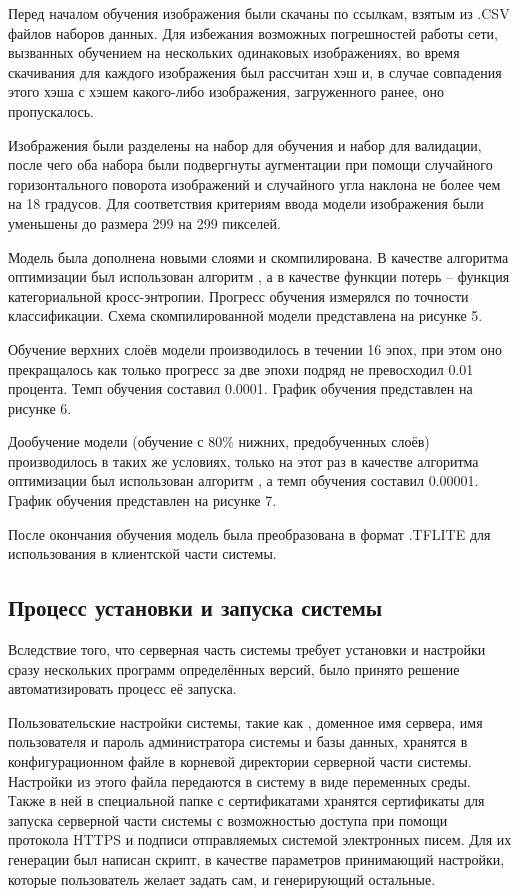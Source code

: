 \tab
Перед началом обучения изображения были скачаны по ссылкам, взятым из .CSV файлов наборов данных.
Для избежания возможных погрешностей работы сети, вызванных обучением на нескольких одинаковых изображениях, во время скачивания для каждого изображения был рассчитан хэш и, в случае совпадения этого хэша с хэшем какого-либо изображения, загруженного ранее, оно пропускалось.

\tab
Изображения были разделены на набор для обучения и набор для валидации, после чего оба набора были подвергнуты аугментации при помощи случайного горизонтального поворота изображений и случайного угла наклона не более чем на 18 градусов.
Для соответствия критериям ввода модели  изображения были уменьшены до размера 299 на 299 пикселей.

\tab
Модель была дополнена новыми слоями и скомпилирована.
В качестве алгоритма оптимизации был использован алгоритм , а в качестве функции потерь -- функция категориальной кросс-энтропии.
Прогресс обучения измерялся по точности классификации.
Схема скомпилированной модели представлена на рисунке 5.

\tab
Обучение верхних слоёв модели производилось в течении 16 эпох, при этом оно прекращалось как только прогресс за две эпохи подряд не превосходил 0.01 процента.
Темп обучения составил 0.0001.
График обучения представлен на рисунке 6.

\tab
Дообучение модели (обучение с 80\%  нижних, предобученных слоёв) производилось в таких же условиях, только на этот раз в качестве алгоритма оптимизации был использован алгоритм , а темп обучения составил 0.00001.
График обучения представлен на рисунке 7.

\tab
После окончания обучения модель была преобразована в формат .TFLITE для использования в клиентской части системы.

\subsection{Процесс установки и запуска системы}
\label{subsec:installing-and-launching}

\tab
Вследствие того, что серверная часть системы требует установки и настройки сразу нескольких программ определённых версий, было принято решение автоматизировать процесс её запуска.

\tab
Пользовательские настройки системы, такие как , доменное имя сервера, имя пользователя и пароль администратора системы и базы данных, хранятся в конфигурационном файле в корневой директории серверной части системы.
Настройки из этого файла передаются в систему в виде переменных среды.
Также в ней в специальной папке с сертификатами хранятся сертификаты для запуска серверной части системы с возможностью доступа при помощи протокола HTTPS и подписи отправляемых системой электронных писем.
Для их генерации был написан скрипт, в качестве параметров принимающий настройки, которые пользователь желает задать сам, и генерирующий остальные.

